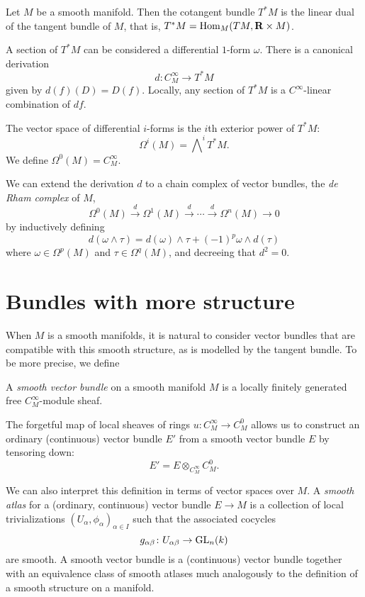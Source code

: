 \documentclass[a4paper,openany]{scrbook}
\begin{document}
Let $M$ be a smooth manifold. Then the cotangent bundle $T^*M$ is the linear dual of the tangent bundle of $M$, that is, $T^*M = \operatorname{Hom}_M(TM,\mathbf R \times M)$.

A section of $T^*M$ can be considered a differential $1$-form $\omega$. There is a canonical derivation
\[
d\colon C^\infty_M \to T^*M 
\]
given by $d(f)(D) = D(f)$. Locally, any section of $T^*M$ is a $C^\infty$-linear combination of $df$.

The vector space of differential $i$-forms is the $i$th exterior power of $T^*M$:
\[
\Omega^i(M) = \bigwedge\nolimits^i T^*M.
\]
We define $\Omega^0(M) = C^\infty_M$.

We can extend the derivation $d$ to a chain complex of vector bundles, the \emph{de Rham complex} of $M$,
\[
\Omega^0(M) \xrightarrow{d} \Omega^1(M) \xrightarrow{d} \cdots \xrightarrow{d} \Omega^n(M) \to 0
\]
by inductively defining
\[
d(\omega \wedge \tau) = d(\omega) \wedge \tau + (-1)^{p} \omega \wedge d(\tau)
\]
where $\omega \in \Omega^p(M)$ and $\tau \in \Omega^q(M)$, and decreeing that $d^2=0$.



\section{Bundles with more structure}

When $M$ is a smooth manifolds, it is natural to consider vector bundles that are compatible with this smooth structure, as is modelled by the tangent bundle. To be more precise, we define

\begin{defn}
A \emph{smooth vector bundle} on a smooth manifold $M$ is a locally finitely generated free $C^\infty_M$-module sheaf.
\end{defn}

The forgetful map of local sheaves of rings $u\colon C^\infty_M \to C^0_M$ allows us to construct an ordinary (continuous) vector bundle $E'$ from a smooth vector bundle $E$ by tensoring down:
\[
E' = E \otimes_{C^\infty_M} C^0_M.
\]

We can also interpret this definition in terms of vector spaces over $M$. A \emph{smooth atlas} for a (ordinary, continuous) vector bundle $E \to M$ is a collection of local trivializations $(U_\alpha,\phi_\alpha)_{\alpha \in I}$ such that the associated cocycles
\[
g_{\alpha\beta}\colon U_{\alpha\beta} \to \operatorname{GL}_n(k)
\]
are smooth. A smooth vector bundle is a (continuous) vector bundle together with an equivalence class of smooth atlases much analogously to the definition of a smooth structure on a manifold.
\end{document}
